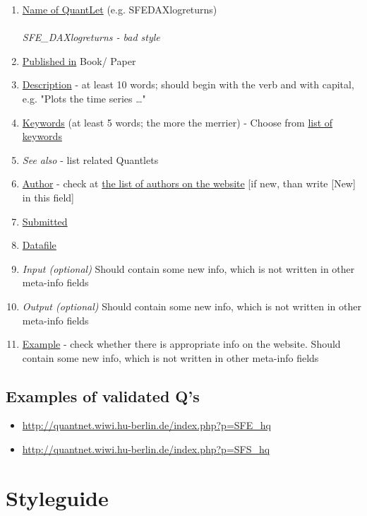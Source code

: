 \documentclass{article}
\begin{document}
\begin{enumerate}[label*=\arabic*.]
\begin{enumerate}[label*=\arabic*.]
		\item \underline{Name of QuantLet} (e.g. SFEDAXlogreturns) \\\\ {\it SFE\_DAXlogreturns - bad style}
		\item \underline{Published in} Book/ Paper
		\item \underline{Description} - at least 10 words; should begin with the verb and with capital, e.g. "Plots the time series \dots"
		\item \underline{Keywords} (at least 5 words; the more the merrier) - 
		Choose from \href{http://quantnet.wiwi.hu-berlin.de/index.php?p=searchResults&w=allkeywords&sort			=f}{list of keywords}
		\item \textit{See also} - list related Quantlets
		\item \underline{Author} - check at  \href{http://quantnet.hu-berlin.de/}{the list of  authors on the 		website} [if new, than write [New] in this field]
		\item \underline{Submitted}
		\item \underline{Datafile}
		\item \textit{Input (optional)} Should contain some new info, which is not written in other meta-info fields
		\item \textit{Output (optional)} Should contain some new info, which is not written in other meta-info fields
		\item \underline{Example} - check whether there is appropriate info on the website. Should contain some new info, which is not written in other meta-info fields
	\end{enumerate}

\end{enumerate}

\subsection*{Examples of validated Q's}
\begin{itemize}
	\item \url{http://quantnet.wiwi.hu-berlin.de/index.php?p=SFE_hq}
	\item \url{http://quantnet.wiwi.hu-berlin.de/index.php?p=SFS_hq}
\end{itemize}

\section*{Styleguide}
\end{document}
